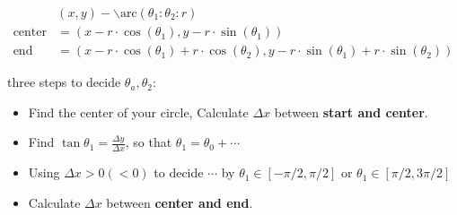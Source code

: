 \documentclass{article}
\begin{document}
\begin{align*}
  & (x, y) - \backslash\mbox{arc}(\theta_1:\theta_2:r) \\ 
  \mbox{center} & = (x-r\cdot \cos(\theta_1), y-r\cdot \sin(\theta_1)) \\
  \mbox{end} & = (x-r\cdot \cos(\theta_1)+r\cdot \cos(\theta_2), y-r\cdot \sin(\theta_1)+r\cdot \sin(\theta_2))
\end{align*}

\begin{center}
\end{center}

three steps to decide $\theta_a,\theta_2$:
\begin{itemize}
  \item Find the center of your circle, Calculate $\Delta x$ between \textbf{start and center}.
  \item Find $\tan\theta_1 = \frac{\Delta y}{\Delta x}$, so that $\theta_1=\theta_0 + \cdots$
  \item Using $\Delta x>0(<0)$ to decide $\cdots$ by $\theta_1\in [-\pi/2, \pi/2]$ or $\theta_1\in [\pi/2,3\pi/2]$
  \item Calculate $\Delta x$ between \textbf{center and end}.
\end{itemize}
\end{document}
